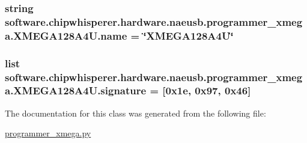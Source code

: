 \subsubsection[{name}]{\setlength{\rightskip}{0pt plus 5cm}string software.\+chipwhisperer.\+hardware.\+naeusb.\+programmer\+\_\+xmega.\+X\+M\+E\+G\+A128\+A4\+U.\+name = \char`\"{}X\+M\+E\+G\+A128\+A4\+U\char`\"{}\hspace{0.3cm}{\ttfamily [static]}}\label{classsoftware_1_1chipwhisperer_1_1hardware_1_1naeusb_1_1programmer__xmega_1_1XMEGA128A4U_ad7fc3995fadd4dbd8f0baefef13994b7}
\hypertarget{classsoftware_1_1chipwhisperer_1_1hardware_1_1naeusb_1_1programmer__xmega_1_1XMEGA128A4U_a81e4cc30c61f76970ba991da1077976a}{}
\subsubsection[{signature}]{\setlength{\rightskip}{0pt plus 5cm}list software.\+chipwhisperer.\+hardware.\+naeusb.\+programmer\+\_\+xmega.\+X\+M\+E\+G\+A128\+A4\+U.\+signature = \mbox{[}0x1e, 0x97, 0x46\mbox{]}\hspace{0.3cm}{\ttfamily [static]}}\label{classsoftware_1_1chipwhisperer_1_1hardware_1_1naeusb_1_1programmer__xmega_1_1XMEGA128A4U_a81e4cc30c61f76970ba991da1077976a}


The documentation for this class was generated from the following file\+:\begin{DoxyCompactItemize}
\item 
\hyperlink{programmer__xmega_8py}{programmer\+\_\+xmega.\+py}\end{DoxyCompactItemize}
